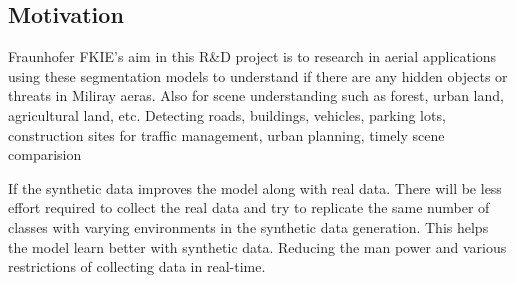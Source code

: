 \documentclass[../report.tex]{subfiles}
\begin{document}


    
    

    \subsection{Motivation}
    \label{sec:introduction:motivation}

    Fraunhofer FKIE's aim in this R\&D project is to research in aerial applications using these segmentation models to understand if there are any hidden objects or threats in Miliray aeras.  
    Also for scene understanding such as forest, urban land, agricultural land, etc. Detecting roads, buildings, vehicles, parking lots, construction sites for traffic management, urban planning, timely scene comparision

    If the synthetic data improves the model along with real data. There will be less effort required to collect the real data and try to replicate the same number of classes with varying environments in the synthetic data generation.
    This helps the model learn better with synthetic data. Reducing the man power and various restrictions of collecting data in real-time. 
\end{document}
